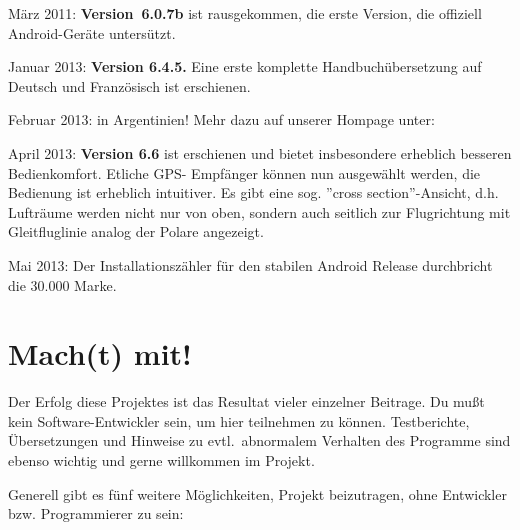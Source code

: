 März 2011: {\bf Version~6.0.7b} ist rausgekommen, die erste Version, die offiziell  Android-Geräte untersützt.

Januar 2013: {\bf Version 6.4.5.} Eine erste komplette Handbuchübersetzung auf Deutsch
und Französisch ist erschienen.

Februar 2013:  in Argentinien! Mehr dazu auf unserer Hompage unter:  

April 2013: {\bf Version 6.6} ist erschienen und bietet insbesondere erheblich besseren Bedienkomfort. Etliche GPS- Empfänger können  nun ausgewählt werden, die Bedienung ist erheblich intuitiver. 
Es gibt eine sog. ''cross section''-Ansicht, d.h. Lufträume werden nicht nur von oben, sondern auch seitlich zur Flugrichtung mit Gleitfluglinie analog der Polare angezeigt.

Mai 2013: Der Installationszähler für den stabilen Android \xc Release durchbricht 
die 30.000 Marke.


\section{Mach(t) mit!}

Der Erfolg diese Projektes ist das Resultat vieler einzelner Beitrage. Du mußt kein Software-Entwickler sein, um hier teilnehmen zu können.
Testberichte, Übersetzungen und Hinweise zu evtl.\ abnormalem Verhalten des Programme sind ebenso wichtig und gerne willkommen
im Projekt.

Generell gibt es fünf weitere Möglichkeiten, Projekt beizutragen, ohne Entwickler bzw. Programmierer zu sein:

